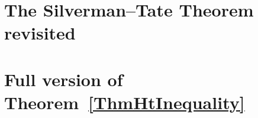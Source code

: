 \documentclass[12pt,oneside]{amsart}
\begin{document}
\appendix
\renewcommand{\thesection}{\Alph{section}}
\setcounter{section}{0}

% 

% 

\section{The Silverman--Tate Theorem revisited}\label{app:silvermantate}


\section{Full version of Theorem~\ref{ThmHtInequality}}\label{AppHtIneqApp}






%

%






\vfill




\end{document}
